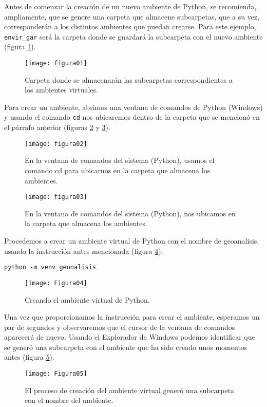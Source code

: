 Antes de comenzar la creación de un nuevo ambiente de Python, se recomienda, ampliamente, que se genere una carpeta que almacene subcarpetas, que a su vez, corresponderán a los distintos ambientes que puedan crearse. Para este ejemplo, \texttt{envir\_gar} será la carpeta donde se guardará la subcarpeta con el nuevo ambiente (figura \ref{fig:figura01}).
	
\begin{figure}[H]
\centering
\texttt{[image: figura01]}
\caption{Carpeta donde se almacenarán las subcarpetas correspondientes a los ambientes virtuales.}
\label{fig:figura01}
\end{figure}
	
Para crear un ambiente, abrimos una ventana de comandos de Python (Windows) y usando el comando \texttt{cd} nos ubicaremos dentro de la carpeta que se mencionó en el párrafo anterior (figuras \ref{fig:figura02} y \ref{fig:figura03}).
\begin{figure}[H]
\centering
\texttt{[image: figura02]}
\caption{En la ventana de comandos del sistema (Python), usamos el comando cd para  ubicarnos en la carpeta que almacena los ambientes.}
\label{fig:figura02}
\end{figure}
	
\begin{figure}[H]
\centering
\texttt{[image: figura03]}
\caption{En la ventana de comandos del sistema (Python), nos ubicamos en la carpeta que almacena los ambientes.}
\label{fig:figura03}
\end{figure}
	
Procedemos a crear un ambiente virtual de Python con el nombre de geoanalisis, usando la instrucción antes mencionada (figura \ref{fig:figura04}).
\begin{verbatim}
python -m venv geonalisis
\end{verbatim}
	
\begin{figure}[H]
\centering
\texttt{[image: Figura04]}
\caption{Creando el ambiente virtual de Python.}
\label{fig:figura04}
\end{figure}
	
Una vez que proporcionamos la instrucción para crear el ambiente, esperamos un par de segundos y observaremos que el cursor de la ventana de comandos aparecerá de nuevo. Usando el Explorador de Windows podemos identificar que se generó una subcarpeta con el ambiente que ha sido creado unos momentos antes (figura \ref{fig:figura05}).
\begin{figure}[H]
\centering
\texttt{[image: Figura05]}
\caption{El proceso de creación del ambiente virtual generó una subcarpeta con el nombre del ambiente.}
\label{fig:figura05}
\end{figure}
	
